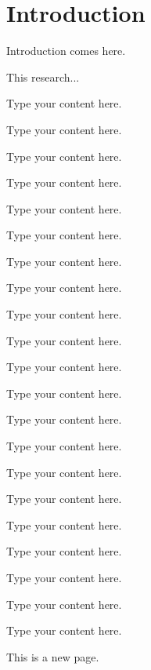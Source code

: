 %

\chapter{Introduction}

{
Introduction comes here.
}

This research...

Type your content here.

Type your content here.

Type your content here.

Type your content here.

Type your content here.

Type your content here.

Type your content here.

Type your content here.

Type your content here.

Type your content here.

Type your content here.

Type your content here.

Type your content here.

Type your content here.

Type your content here.

Type your content here.

Type your content here.

Type your content here.

Type your content here.

Type your content here.

Type your content here.

This is a new page. 

\chapterend

